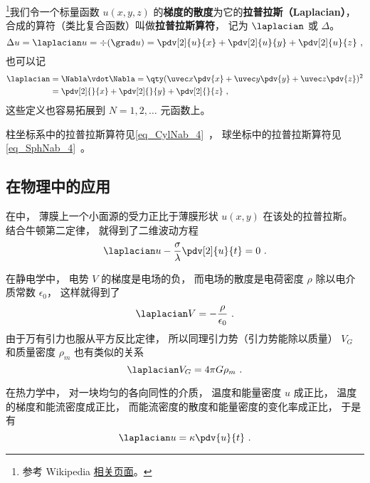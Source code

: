 

\footnote{参考 Wikipedia \href{https://en.wikipedia.org/wiki/Laplace_operator}{相关页面}。}我们令一个标量函数 $u(x, y, z)$ 的\textbf{梯度的散度}为它的\textbf{拉普拉斯（Laplacian）}， 合成的算符（类比复合函数）叫做\textbf{拉普拉斯算符}， 记为 $\laplacian$ 或 $\Delta$。
\begin{equation}
\Delta u = \laplacian u = \div (\grad u) = \pdv[2]{u}{x} + \pdv[2]{u}{y} + \pdv[2]{u}{z}~,
\end{equation}
也可以记
\begin{equation}
\begin{aligned}
\laplacian &= \Nabla \vdot \Nabla = \qty(\uvec x\pdv{x} + \uvec y\pdv{y} + \uvec z\pdv{z})^2\\
&= \pdv[2]{}{x} + \pdv[2]{}{y} + \pdv[2]{}{z}~,
\end{aligned}
\end{equation}
这些定义也容易拓展到 $N = 1, 2, \dots$ 元函数上。

柱坐标系中的拉普拉斯算符见\autoref{eq_CylNab_4}~， 球坐标中的拉普拉斯算符见\autoref{eq_SphNab_4}~。

\subsection{在物理中的应用}
在中， 薄膜上一个小面源的受力正比于薄膜形状 $u(x, y)$ 在该处的拉普拉斯。 结合牛顿第二定律， 就得到了二维波动方程
\begin{equation}
\laplacian u - \frac{\sigma}{\lambda}\pdv[2]{u}{t} = 0~.
\end{equation}

在静电学中， 电势 $V$ 的梯度是电场的负， 而电场的散度是电荷密度 $\rho$ 除以电介质常数 $\epsilon_0$， 这样就得到了
\begin{equation}
\laplacian V = -\frac{\rho}{\epsilon_0}~.
\end{equation}
由于万有引力也服从平方反比定律， 所以同理引力势（引力势能除以质量） $V_G$ 和质量密度 $\rho_m$ 也有类似的关系
\begin{equation}
\laplacian V_G = 4\pi G \rho_m~.
\end{equation}

在热力学中， 对一块均匀的各向同性的介质， 温度和能量密度 $u$ 成正比， 温度的梯度和能流密度成正比， 而能流密度的散度和能量密度的变化率成正比， 于是有
\begin{equation}
\laplacian u = \kappa \pdv{u}{t}~.
\end{equation}
